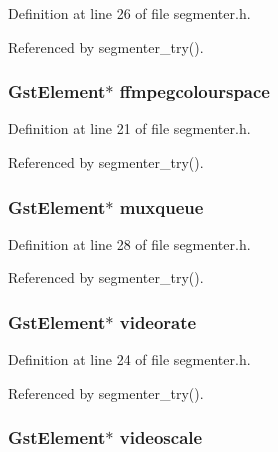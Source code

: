 \-Definition at line 26 of file segmenter.\-h.



\-Referenced by segmenter\-\_\-try().

\hypertarget{struct__video__bag_ae45b3f4ec98e5e429bf58f9ded85c0b4}{
\subsubsection[{ffmpegcolourspace}]{\setlength{\rightskip}{0pt plus 5cm}\-Gst\-Element$\ast$ {\bf ffmpegcolourspace}}}\label{struct__video__bag_ae45b3f4ec98e5e429bf58f9ded85c0b4}


\-Definition at line 21 of file segmenter.\-h.



\-Referenced by segmenter\-\_\-try().

\hypertarget{struct__video__bag_a917a2aa09433aafbcda72454d53c196f}{
\subsubsection[{muxqueue}]{\setlength{\rightskip}{0pt plus 5cm}\-Gst\-Element$\ast$ {\bf muxqueue}}}\label{struct__video__bag_a917a2aa09433aafbcda72454d53c196f}


\-Definition at line 28 of file segmenter.\-h.



\-Referenced by segmenter\-\_\-try().

\hypertarget{struct__video__bag_a14ada90c504b234ba99ef9a409d6a52f}{
\subsubsection[{videorate}]{\setlength{\rightskip}{0pt plus 5cm}\-Gst\-Element$\ast$ {\bf videorate}}}\label{struct__video__bag_a14ada90c504b234ba99ef9a409d6a52f}


\-Definition at line 24 of file segmenter.\-h.



\-Referenced by segmenter\-\_\-try().

\hypertarget{struct__video__bag_a87efc6ab0a3185089398de023439e26b}{
\subsubsection[{videoscale}]{\setlength{\rightskip}{0pt plus 5cm}\-Gst\-Element$\ast$ {\bf videoscale}}}\label{struct__video__bag_a87efc6ab0a3185089398de023439e26b}


